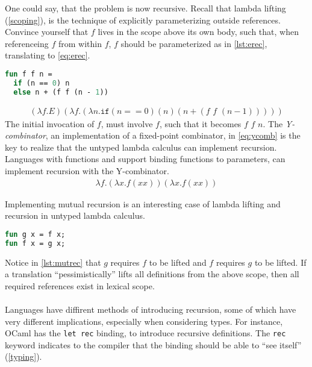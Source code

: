 \documentclass[11pt,oneside,a4paper]{report}
\begin{document}
One could say, that the problem is now recursive.
Recall that lambda lifting (\autoref{scoping}), is the technique of explicitly parameterizing outside references.
Convince yourself that $f$ lives in the scope above its own body, such that, when referenceing $f$ from within $f$, $f$ should be parameterized as in \autoref{lst:erec}, translating to \autoref{eq:erec}.
\begin{lstlisting}[language=ML,caption={Explicitly passing recursive function},label={lst:erec}]
fun f f n = 
  if (n == 0) n
  else n + (f f (n - 1))
\end{lstlisting}
\begin{align}
    (\lambda f . E) (\lambda f . (\lambda n . \texttt{if} (n == 0) (n) (n + (f \,\, f \,\, (n - 1)))))
    \label{eq:erec}
\end{align}
The initial invocation of $f$, must involve $f$, such that it becomes $f \,\, f \,\, n$.
The \textit{Y-combinator}, an implementation of a fixed-point combinator, in \autoref{eq:ycomb} is the key to realize that the untyped lambda calculus can implement recursion.
Languages with functions and support binding functions to parameters, can implement recursion with the Y-combinator.
\begin{align}
    \lambda f . (\lambda x . f (x x)) (\lambda x . f (x x))
    \label{eq:ycomb}
\end{align}

Implementing mutual recursion is an interesting case of lambda lifting and recursion in untyped lambda calculus.
\begin{lstlisting}[language=ML,caption={Mutual recursion},label={lst:mutrec}]
fun g x = f x;
fun f x = g x;
\end{lstlisting}
Notice in \autoref{lst:mutrec} that $g$ requires $f$ to be lifted and $f$ requires $g$ to be lifted.
If a translation ``pessimistically'' lifts all definitions from the above scope, then all required references exist in lexical scope.
\\\\
Languages have diffirent methods of introducing recursion, some of which have very different implications, especially when considering types.
For instance, OCaml has the \texttt{let rec} binding, to introduce recursive definitions.
The \texttt{rec} keyword indicates to the compiler that the binding should be able to ``see itself'' (\autoref{typing}).
\end{document}

